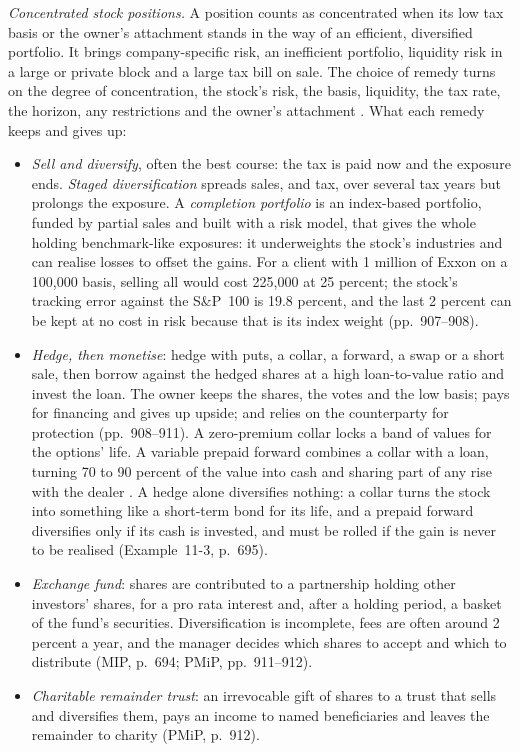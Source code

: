 \begin{qfmethod}
\emph{Concentrated stock positions.} A position counts as concentrated when its low tax basis or the owner's attachment stands in the way of an efficient, diversified portfolio. It brings company-specific risk, an inefficient portfolio, liquidity risk in a large or private block and a large tax bill on sale. The choice of remedy turns on the degree of concentration, the stock's risk, the basis, liquidity, the tax rate, the horizon, any restrictions and the owner's attachment \citep[chap.~16, sec.~6.1, pp.~904--906]{portfolio-management-in-practice-v1-2020}. What each remedy keeps and gives up:
\begin{itemize}
\item \emph{Sell and diversify}, often the best course: the tax is paid now and the exposure ends. \emph{Staged diversification} spreads sales, and tax, over several tax years but prolongs the exposure. A \emph{completion portfolio} is an index-based portfolio, funded by partial sales and built with a risk model, that gives the whole holding benchmark-like exposures: it underweights the stock's industries and can realise losses to offset the gains. For a client with 1 million of Exxon on a 100{,}000 basis, selling all would cost 225{,}000 at 25 percent; the stock's tracking error against the S\&P~100 is 19.8 percent, and the last 2 percent can be kept at no cost in risk because that is its index weight (pp.~907--908).
\item \emph{Hedge, then monetise}: hedge with puts, a collar, a forward, a swap or a short sale, then borrow against the hedged shares at a high loan-to-value ratio and invest the loan. The owner keeps the shares, the votes and the low basis; pays for financing and gives up upside; and relies on the counterparty for protection (pp.~908--911). A zero-premium collar locks a band of values for the options' life. A variable prepaid forward combines a collar with a loan, turning 70 to 90 percent of the value into cash and sharing part of any rise with the dealer \citep[Exhibit~11-4, p.~694]{managing-investment-portfolios-2007}. A hedge alone diversifies nothing: a collar turns the stock into something like a short-term bond for its life, and a prepaid forward diversifies only if its cash is invested, and must be rolled if the gain is never to be realised (Example~11-3, p.~695).
\item \emph{Exchange fund}: shares are contributed to a partnership holding other investors' shares, for a pro rata interest and, after a holding period, a basket of the fund's securities. Diversification is incomplete, fees are often around 2 percent a year, and the manager decides which shares to accept and which to distribute (MIP, p.~694; PMiP, pp.~911--912).
\item \emph{Charitable remainder trust}: an irrevocable gift of shares to a trust that sells and diversifies them, pays an income to named beneficiaries and leaves the remainder to charity (PMiP, p.~912).
\end{itemize}


\end{qfmethod}
